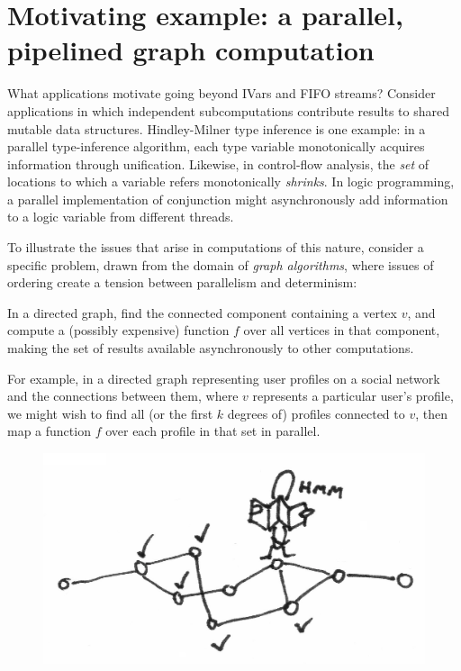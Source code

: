 \section{Motivating example: a parallel, pipelined graph computation}\label{s:lvars-motivation}

What applications motivate going beyond IVars and FIFO streams?
Consider applications in which independent subcomputations contribute
results to shared mutable data structures.  
Hindley-Milner type inference is one example: in a
parallel type-inference algorithm, each type variable monotonically
acquires information through unification.
Likewise, in control-flow analysis, the \emph{set} of
locations to which a variable refers monotonically \emph{shrinks}.  In
logic programming, a parallel implementation of conjunction might
asynchronously add information to a logic variable from different
threads.

To illustrate the issues that arise in computations of this nature,
consider a specific problem, drawn from the domain of \emph{graph
  algorithms}, where issues of ordering create a tension between
parallelism and determinism:
\begin{blockquote}
  In a directed graph, find the connected component containing a
  vertex $v$, and compute a (possibly expensive) function $f$ over all
  vertices in that component, making the set of results available
  asynchronously to other computations.
\end{blockquote}
\noindent For example, in a directed graph representing user profiles on a
social network and the connections between them, where $v$ represents
a particular user's profile, we might wish to find all (or the first $k$
degrees of) profiles connected to $v$, then map a function $f$ over
each profile in that set in parallel.

\ifdefined\DISSERTATION
\begin{figure}
\vspace{-1em}
\begin{center}
  \includegraphics[scale=0.15]{../illustrations/graph-traversal}
\end{center}
\vspace{-1em}
\end{figure}
\fi

